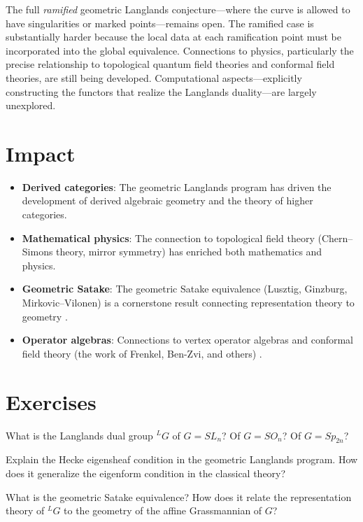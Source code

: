 The full \emph{ramified} geometric Langlands conjecture---where the curve is allowed to have singularities or marked points---remains open. The ramified case is substantially harder because the local data at each ramification point must be incorporated into the global equivalence. Connections to physics, particularly the precise relationship to topological quantum field theories and conformal field theories, are still being developed. Computational aspects---explicitly constructing the functors that realize the Langlands duality---are largely unexplored.

\section{Impact}

\begin{itemize}
\item \textbf{Derived categories}: The geometric Langlands program has driven the development of derived algebraic geometry and the theory of higher categories.
\item \textbf{Mathematical physics}: The connection to topological field theory (Chern--Simons theory, mirror symmetry) has enriched both mathematics and physics.
\item \textbf{Geometric Satake}: The geometric Satake equivalence (Lusztig, Ginzburg, Mirkovic--Vilonen) is a cornerstone result connecting representation theory to geometry \cite{mirkovic2007}.
\item \textbf{Operator algebras}: Connections to vertex operator algebras and conformal field theory (the work of Frenkel, Ben-Zvi, and others) \cite{frenkel2007}.
\end{itemize}

\section{Exercises}

\begin{exercise}[Basic]
What is the Langlands dual group $^LG$ of $G = SL_n$? Of $G = SO_n$? Of $G = Sp_{2n}$?
\end{exercise}

\begin{exercise}[Intermediate]
Explain the Hecke eigensheaf condition in the geometric Langlands program. How does it generalize the eigenform condition in the classical theory?
\end{exercise}

\begin{exercise}[Challenge]
What is the geometric Satake equivalence? How does it relate the representation theory of $^LG$ to the geometry of the affine Grassmannian of $G$? \cite{mirkovic2007}
\end{exercise}

